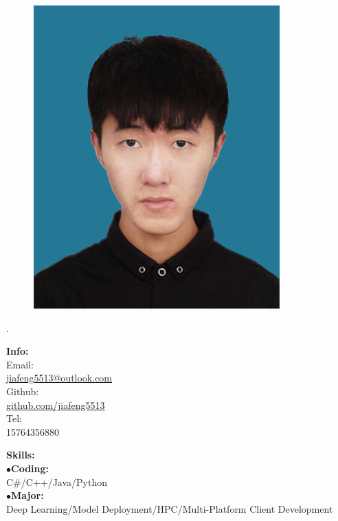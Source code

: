 \documentclass[a4paper,12pt,final]{memoir}
\newcommand{\myThemeColor}{RoyalBlue}
\newcommand{\SmallSep}{\vspace{0.9em}}
\newcommand{\CVItem}[1]
	{\textbf{\color{\myThemeColor} #1}}
\begin{document}
\begin{CJK*}{UTF8}{gbsn}%
\begin{figure}
	\hfill
	\includegraphics[width=0.8\columnwidth]{photo}
	\vspace{-7cm}
\end{figure}
\begin{flushright}\footnotesize
.\\
\vskip 6cm
    \raggedright
	\CVItem{{\large Info:}}\\
	Email:\\
	\href{mailto:jiafeng5513@outlook.com}{jiafeng5513@outlook.com}  \\
	Github:\\
	\href{github.com/jiafeng5513}{github.com/jiafeng5513} \\
	Tel:\\
	15764356880
	\SmallSep
	\SmallSep

	\CVItem{{\large Skills:}}\\
	$\bullet$\textbf{Coding:}\\ C\#/C++/Java/Python\\
	$\bullet$\textbf{Major:}\\ Deep Learning/Model Deployment/HPC/Multi-Platform Client Development \\


\end{flushright}
\end{CJK*}
\end{document}
